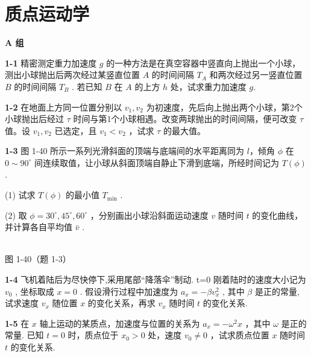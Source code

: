 \chapter{质点运动学}
\begin{center}\textbf{A 组}\end{center}

\textbf{1-1} 精密测定重力加速度 $g$ 的一种方法是在真空容器中竖直向上抛出一个小球，测出小球抛出后两次经过某竖直位置 $A$ 的时间间隔 $T_{A}$ 和两次经过另一竖直位置 $B$ 的时间间隔 $T_{B}$ . 若已知 $B$ 在 $A$ 的上方 $h$ 处，试求重力加速度 $g$.

\newpage

\textbf{1-2} 在地面上方同一位置分别以 $v_{1}, v_{2}$ 为初速度，先后向上抛出两个小球，第2个小球抛出后经过 $\tau$ 时间与第1个小球相遇。改变两球抛出的时间间隔，便可改变 $\tau$ 值。设 $v_{1}, v_{2}$ 已选定，且 $v_{1} < v_{2}$ ，试求 $\tau$ 的最大值。

\newpage

\textbf{1-3} 图 1-40 所示一系列光滑斜面的顶端与底端间的水平距离同为 $l$，倾角 $\phi$ 在 $0 \sim 90^{\circ}$ 间连续取值，让小球从斜面顶端自静止下滑到底端，所经时间记为 $T(\phi)$ .

(1) 试求 $T(\phi)$ 的最小值 $T_{\min}$ .

(2) 取 $\phi=30^{\circ},45^{\circ},60^{\circ}$ ，分别画出小球沿斜面运动速度 $v$ 随时间 $t$ 的变化曲线，并计算各自平均值 $\bar{v}$ .

\begin{center}
\resizebox{0.36\textwidth}{!}{}\\[4pt]
{\small 图 1-40（题 1-3）}
\end{center}

\newpage

\textbf{1-4} 飞机着陆后为尽快停下,采用尾部“降落伞”制动. t=0 刚着陆时的速度大小记为 $v_{0}$ , 坐标取成 $x = 0$ . 假设滑行过程中加速度为 $a_{x} = -\beta v_{x}^{2}$ , 其中 $\beta$ 是正的常量, 试求速度 $v_{x}$ 随位置 $x$ 的变化关系，再求 $v_x$ 随时间 $t$ 的变化关系.

\newpage

\textbf{1-5} 在 $x$ 轴上运动的某质点，加速度与位置的关系为 $a_x = -\omega^2 x$ ，其中 $\omega$ 是正的常量. 已知 $t = 0$ 时，质点位于 $x_0 > 0$ 处，速度 $v_0 \neq 0$ ，试求质点位置 $x$ 随时间 $t$ 的变化关系.

